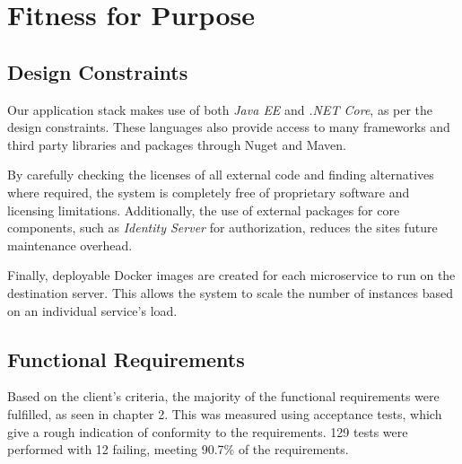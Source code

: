\section{Fitness for Purpose}
  \subsection{Design Constraints}
  \par
  Our application stack makes use of both \textit{Java EE} and \textit{.NET Core}, as per the design constraints. These languages also provide access to many frameworks and third party libraries and packages through Nuget and Maven.

  \par
  By carefully checking the licenses of all external code and finding alternatives where required, the system is completely free of proprietary software and licensing limitations. Additionally, the use of external packages for core components, such as \textit{Identity Server} for authorization, reduces the sites future maintenance overhead.

  \par
  Finally, deployable Docker images are created for each microservice to run on the destination server. This allows the system to scale the number of instances based on an individual service's load.

  \subsection{Functional Requirements}
  \par
  Based on the client's criteria, the majority of the functional requirements were fulfilled, as seen in chapter 2. This was measured using acceptance tests, which give a rough indication of conformity to the requirements. 129 tests were performed with 12 failing, meeting 90.7\% of the requirements.
